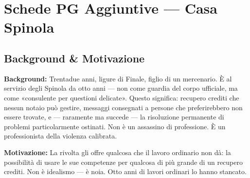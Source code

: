 
\chapter{Schede PG Aggiuntive --- Casa Spinola}



\section*{Background \& Motivazione}

\begin{rulebox}{}
  \textbf{Background:} Trentadue anni, ligure di Finale, figlio di un mercenario.
  È al servizio degli Spinola da otto anni — non come guardia del corpo ufficiale,
  ma come «consulente per questioni delicate». Questo significa: recupero crediti
  che nessun notaio può gestire, messaggi consegnati a persone che preferirebbero
  non essere trovate, e — raramente ma succede — la risoluzione permanente di
  problemi particolarmente ostinati. Non è un assassino di professione.
  È un professionista della violenza calibrata.

  \medskip\noindent\textcolor{SpinolaRed}{\textbf{Motivazione:}} La rivolta gli
  offre qualcosa che il lavoro ordinario non dà: la possibilità di usare
  le sue competenze per qualcosa di più grande di un recupero crediti.
  Non è idealismo — è noia. Otto anni di lavori ordinari lo hanno stancato.
\end{rulebox}

